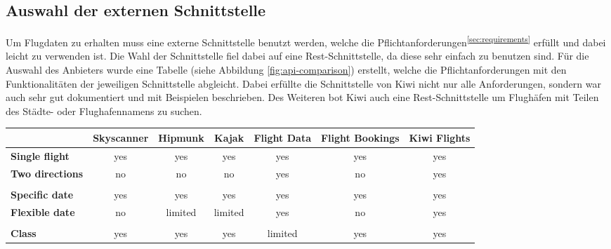 \documentclass[12pt,twoside,a4paper]{article}
\begin{document}
\begin{sloppypar}
\subsection{Auswahl der externen Schnittstelle}
Um Flugdaten zu erhalten muss eine externe Schnittstelle benutzt werden, welche die Pflichtanforderungen\textsuperscript{\ref{sec:requirements}} erfüllt und dabei leicht zu verwenden ist. Die Wahl der Schnittstelle fiel dabei auf eine Rest-Schnittstelle, da diese sehr einfach zu benutzen sind. Für die Auswahl des Anbieters wurde eine Tabelle (siehe Abbildung \ref{fig:api-comparison}) erstellt, welche die Pflichtanforderungen mit den Funktionalitäten der jeweiligen Schnittstelle abgleicht. Dabei erfüllte die Schnittstelle von Kiwi nicht nur alle Anforderungen, sondern war auch sehr gut dokumentiert und mit Beispielen beschrieben. Des Weiteren bot Kiwi auch eine Rest-Schnittstelle um Flughäfen mit Teilen des Städte- oder Flughafennamens zu suchen.
\begin{center}
	\captionsetup{type=figure}
	\resizebox{\textwidth}{!}
	{\begin{tabular}{ l | c | c | c | c | c | c }
			& \textbf{Skyscanner} & \textbf{Hipmunk} & \textbf{Kajak} & \textbf{Flight Data} & \textbf{Flight Bookings} & \textbf{Kiwi Flights}\\
			\hline
			\textbf{Single flight} & \cellcolor{green!50}yes & \cellcolor{green!50}yes & \cellcolor{green!50}yes & \cellcolor{green!50}yes & \cellcolor{green!50}yes & \cellcolor{green!50}yes\\
			\hline
			\textbf{Two directions} & \cellcolor{red!75}no & \cellcolor{red!75}no & \cellcolor{red!75}no & \cellcolor{green!50}yes & \cellcolor{red!75}no & \cellcolor{green!50}yes\\
			\hline
			& & & & & &\\
			\hline
			\textbf{Specific date} & \cellcolor{green!50}yes & \cellcolor{green!50}yes & \cellcolor{green!50}yes & \cellcolor{green!50}yes & \cellcolor{green!50}yes & \cellcolor{green!50}yes\\
			\hline
			\textbf{Flexible date} & \cellcolor{red!75}no & \cellcolor{yellow!75}limited & \cellcolor{yellow!75}limited & \cellcolor{green!50}yes & \cellcolor{red!75}no & \cellcolor{green!50}yes\\
			\hline
			& & & & & &\\
			\hline
			\textbf{Class} & \cellcolor{green!50}yes & \cellcolor{green!50}yes & \cellcolor{green!50}yes & \cellcolor{yellow!75}limited & \cellcolor{green!50}yes & \cellcolor{green!50}yes\\

\end{tabular}}
\end{center}
\end{sloppypar}
\end{document}
